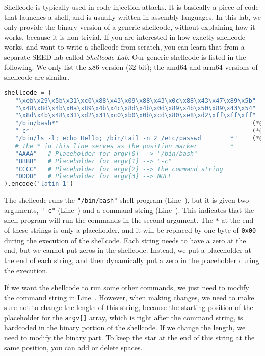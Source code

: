 

Shellcode is typically used in code injection attacks.
It is basically a piece of code that launches a shell, and
is usually written in assembly languages.
In this lab, we only provide the binary version of a generic shellcode,
without explaining how it works, because it is non-trivial.
If you are interested in how exactly shellcode works, and
want to write a shellcode from scratch, you
can learn that from a separate SEED lab called \textit{Shellcode Lab}.
Our generic shellcode is listed in the following. We only list
the x86 version (32-bit); the amd64 and arm64 versions of shellcode
are similar. 

\begin{lstlisting}[language=python]
shellcode = (
   "\xeb\x29\x5b\x31\xc0\x88\x43\x09\x88\x43\x0c\x88\x43\x47\x89\x5b"
   "\x48\x8d\x4b\x0a\x89\x4b\x4c\x8d\x4b\x0d\x89\x4b\x50\x89\x43\x54"
   "\x8d\x4b\x48\x31\xd2\x31\xc0\xb0\x0b\xcd\x80\xe8\xd2\xff\xff\xff"
   "/bin/bash*"                                                     (*@\ding{202}@*)
   "-c*"                                                            (*@\ding{203}@*)
   "/bin/ls -l; echo Hello; /bin/tail -n 2 /etc/passwd        *"    (*@\ding{204}@*)
   # The * in this line serves as the position marker         *
   "AAAA"   # Placeholder for argv[0] --> "/bin/bash"
   "BBBB"   # Placeholder for argv[1] --> "-c"
   "CCCC"   # Placeholder for argv[2] --> the command string
   "DDDD"   # Placeholder for argv[3] --> NULL
).encode('latin-1')
\end{lstlisting}

The shellcode runs the \texttt{"/bin/bash"} shell program (Line~),
but it is given two arguments, \texttt{"-c"} (Line~) and
a command string (Line~). This indicates that the shell program
will run the commands in the second argument.
The \texttt{*} at the end of these strings is only a placeholder,
and it will be replaced by
one byte of \texttt{0x00} during the execution of the shellcode. 
Each string needs to have a zero at the end, but we cannot put 
zeros in the shellcode. Instead, we put a placeholder at the end of each string, 
and then dynamically put a zero in the placeholder during the 
execution. 

If we want the shellcode to run some other commands,
we just need to modify the command string in Line~.
However, when making changes, we need to
make sure not to change the length of this string, because the
starting position of the placeholder for the \texttt{argv[]} array,
which is right after the command string,
is hardcoded in the binary portion of the shellcode. If
we change the length, we need to modify the binary part.
To keep the star at the end of this string at the same position,
you can add or delete spaces.



